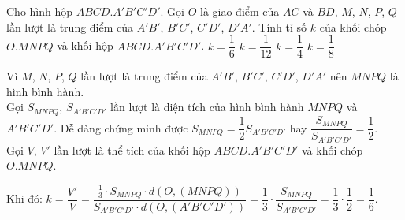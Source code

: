 \begin{ex}%
 Cho hình hộp $ABCD.A'B'C'D'$. Gọi $O$ là giao điểm của $AC$ và $BD$, $M$, $N$, $P$, $Q$ lần lượt là trung điểm của $A'B'$, $B'C'$, $C'D'$, $D'A'$. Tính tỉ số $k$ của khối chóp $O.MNPQ$ và khối hộp $ABCD.A'B'C'D'$.
 \choice
  {\True $k = \dfrac{1}{6}$}
  {$k = \dfrac{1}{12}$}
  {$k = \dfrac{1}{4}$}
  {$k = \dfrac{1}{8}$}
 \loigiai
  {
  \immini
  {
  Vì $M$, $N$, $P$, $Q$ lần lượt là trung điểm của $A'B'$, $B'C'$, $C'D'$, $D'A'$ nên $MNPQ$ là hình bình hành.\\
  Gọi $S_{MNPQ}$, $S_{A'B'C'D'}$ lần lượt là diện tích của hình bình hành $MNPQ$ và $A'B'C'D'$. Dễ dàng chứng minh được $S_{MNPQ} = \dfrac{1}{2} S_{A'B'C'D'}$ hay $\dfrac{S_{MNPQ}}{S_{A'B'C'D'}} = \dfrac{1}{2}$.\\
  Gọi $V$, $V'$ lần lượt là thể tích của khối hộp $ABCD.A'B'C'D'$ và khối chóp $O.MNPQ$.  }
  {
  }
Khi đó: $k = \dfrac{V'}{V} = \dfrac{\frac{1}{3} \cdot S_{MNPQ} \cdot d(O, (MNPQ))}{S_{A'B'C'D'} \cdot d(O, (A'B'C'D'))}= \dfrac{1}{3} \cdot \dfrac{S_{MNPQ}}{S_{A'B'C'D'}} = \dfrac{1}{3} \cdot \dfrac{1}{2} = \dfrac{1}{6}$.
  }
\end{ex}


